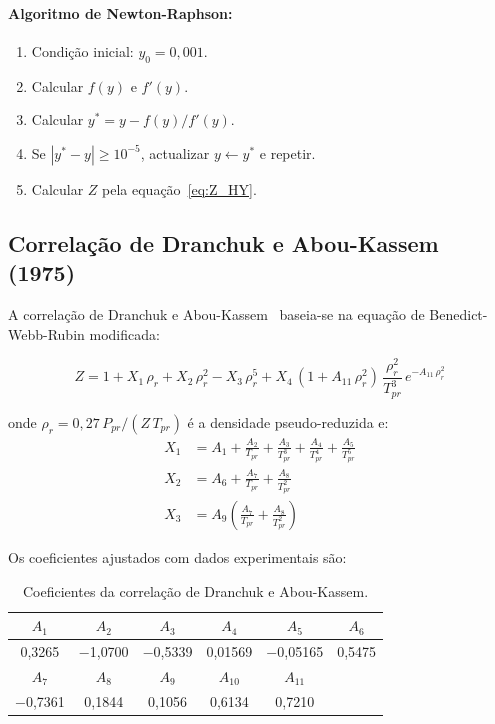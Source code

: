 \documentclass[12pt,a4paper]{article}
\begin{document}
\paragraph{Algoritmo de Newton-Raphson:}
\begin{enumerate}[noitemsep]
  \item Condição inicial: $y_0 = 0{,}001$.
  \item Calcular $f(y)$ e $f'(y)$.
  \item Calcular $y^* = y - f(y)/f'(y)$.
  \item Se $|y^* - y| \geq 10^{-5}$, actualizar $y \leftarrow y^*$ e repetir.
  \item Calcular $Z$ pela equação~\eqref{eq:Z_HY}.
\end{enumerate}

\subsection{Correlação de Dranchuk e Abou-Kassem (1975)}

A correlação de Dranchuk e Abou-Kassem~\cite{DAK1975} baseia-se na equação
de Benedict-Webb-Rubin modificada:

\begin{equation}
  Z = 1 + X_1\,\rho_r + X_2\,\rho_r^2 - X_3\,\rho_r^5
    + X_4\,(1 + A_{11}\,\rho_r^2)\,\frac{\rho_r^2}{T_{pr}^3}\,e^{-A_{11}\,\rho_r^2}
  \label{eq:DAK}
\end{equation}

onde $\rho_r = 0{,}27\,P_{pr}/(Z\,T_{pr})$ é a densidade pseudo-reduzida e:
\begin{align}
  X_1 &= A_1 + \frac{A_2}{T_{pr}} + \frac{A_3}{T_{pr}^3}
         + \frac{A_4}{T_{pr}^4} + \frac{A_5}{T_{pr}^5}\\
  X_2 &= A_6 + \frac{A_7}{T_{pr}} + \frac{A_8}{T_{pr}^2}\\
  X_3 &= A_9\!\left(\frac{A_7}{T_{pr}} + \frac{A_8}{T_{pr}^2}\right)
\end{align}

Os coeficientes ajustados com dados experimentais são:

\begin{table}[H]
\centering
\caption{Coeficientes da correlação de Dranchuk e Abou-Kassem.}
\begin{tabular}{cccccc}
\toprule
$A_1$ & $A_2$ & $A_3$ & $A_4$ & $A_5$ & $A_6$ \\
\midrule
0{,}3265 & $-$1{,}0700 & $-$0{,}5339 & 0{,}01569 & $-$0{,}05165 & 0{,}5475 \\
\midrule
$A_7$ & $A_8$ & $A_9$ & $A_{10}$ & $A_{11}$ & \\
\midrule
$-$0{,}7361 & 0{,}1844 & 0{,}1056 & 0{,}6134 & 0{,}7210 & \\
\bottomrule
\end{tabular}
\label{tab:dak_coef}
\end{table}
\end{document}
